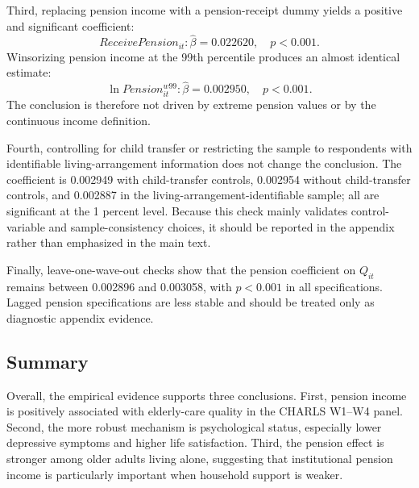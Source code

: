 Third, replacing pension income with a pension-receipt dummy yields a positive and significant coefficient:
\[
ReceivePension_{it}: \widehat{\beta}=0.022620,\quad p<0.001.
\]
Winsorizing pension income at the 99th percentile produces an almost identical estimate:
\[
\ln Pension^{w99}_{it}: \widehat{\beta}=0.002950,\quad p<0.001.
\]
The conclusion is therefore not driven by extreme pension values or by the continuous income definition.

Fourth, controlling for child transfer or restricting the sample to respondents with identifiable living-arrangement information does not change the conclusion. The coefficient is 0.002949 with child-transfer controls, 0.002954 without child-transfer controls, and 0.002887 in the living-arrangement-identifiable sample; all are significant at the 1 percent level. Because this check mainly validates control-variable and sample-consistency choices, it should be reported in the appendix rather than emphasized in the main text.

Finally, leave-one-wave-out checks show that the pension coefficient on \(Q_{it}\) remains between 0.002896 and 0.003058, with \(p<0.001\) in all specifications. Lagged pension specifications are less stable and should be treated only as diagnostic appendix evidence.

\subsection{Summary}

Overall, the empirical evidence supports three conclusions. First, pension income is positively associated with elderly-care quality in the CHARLS W1--W4 panel. Second, the more robust mechanism is psychological status, especially lower depressive symptoms and higher life satisfaction. Third, the pension effect is stronger among older adults living alone, suggesting that institutional pension income is particularly important when household support is weaker.
